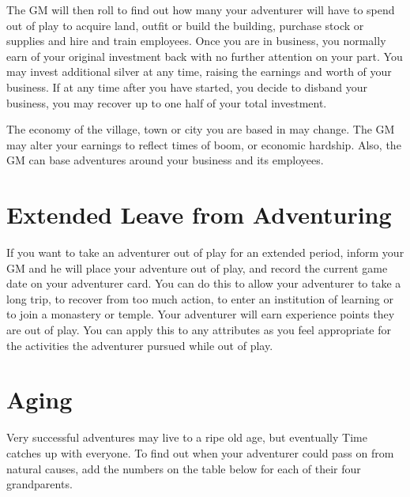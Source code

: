 \begin{multicols}{2}
The GM will then roll  to find out how many  your adventurer will have to spend out of play to acquire land, outfit or build the building, purchase stock or supplies and hire and train employees. Once you are in business, you normally earn  of your original investment back  with no further attention on your part. You may invest additional silver at any time, raising the earnings and worth of your business. If at any time after you have started, you decide to disband your business, you may recover up to one half of your total investment.

The economy of the village, town or city you are based in may change. The GM may alter your earnings to reflect times of boom, or economic hardship. Also, the GM can base adventures around your business and its employees.
\section{Extended Leave from Adventuring}
If you want to take an adventurer out of play for an extended period, inform your GM and he will place your adventure out of play, and record the current game date on your adventurer card. You can do this to allow your adventurer to take a long trip, to recover from too much action, to enter an institution of learning or to join a monastery or temple. Your adventurer will earn  experience points  they are out of play. You can apply this to any attributes as you feel appropriate for the activities the adventurer pursued while out of play. 

\indx{Day\xspace of Awakening}
\section{Aging}
Very successful adventures may live to a ripe old age, but eventually Time catches up with everyone. To find out when your adventurer could pass on from natural causes, add the numbers on the table below for each of their four grandparents.


\end{multicols}
